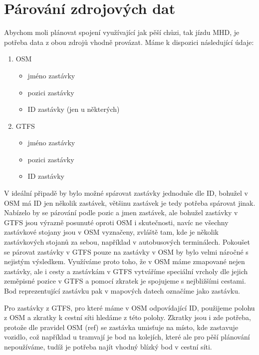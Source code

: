 \section{Párování zdrojových dat}
Abychom moli plánovat spojení využívající jak pěší chůzi, tak jízdu MHD, je
potřeba data z obou zdrojů vhodně provázat. Máme k dispozici následující údaje:
\begin{enumerate}
\item OSM
\begin{itemize}
	\item jméno zastávky
	\item pozici zastávky
	\item ID zastávky (jen u některých)
\end{itemize}
\item GTFS
\begin{itemize}
	\item jméno zastávky
	\item pozici zastávky
	\item ID zastávky
\end{itemize}
\end{enumerate} 
V ideální připadě by bylo možné spárovat zastávky jednoduše dle ID, bohužel v
OSM má ID jen několik zastávek, většinu zastávek je tedy potřeba spárovat jinak.
Nabízelo by se párování podle pozic a jmen zastávek, ale bohužel zastávky v GTFS
jsou výrazně posunuté oproti OSM i skutečnosti, navíc ne všechny zastávkové
stojany jsou v OSM vyznačeny, zvláště tam, kde je několik zastávkových stojanů
za sebou, například v autobusových terminálech. Pokoušet se párovat zastávky v
GTFS pouze na zastávky v OSM by bylo velmi náročné s nejistým výsledkem.
Využíváme proto toho, že v OSM máme zmapované nejen zastávky, ale i cesty a
zastávkám v GTFS vytváříme speciální vrcholy dle jejich zeměpisné pozice v GTFS
a pomocí zkratek je spojujeme s nejbližšími cestami. Bod reprezentující zastávku
pak v mapových datech označíme jako zastávku.

Pro zastávky z GTFS, pro které máme v OSM odpovídající ID, použijeme polohu z
OSM a zkratky k cestní síti hledáme z této polohy. Zkratky jsou i zde potřeba,
protože dle pravidel OSM (\TODO ref) se zastávka umisťuje na místo, kde zastavuje
vozidlo, což například u tramvají je bod na kolejích, které ale pro pěší
plánování nepoužíváme, tudíž je potřeba najít vhodný blízký bod v cestní síti.

